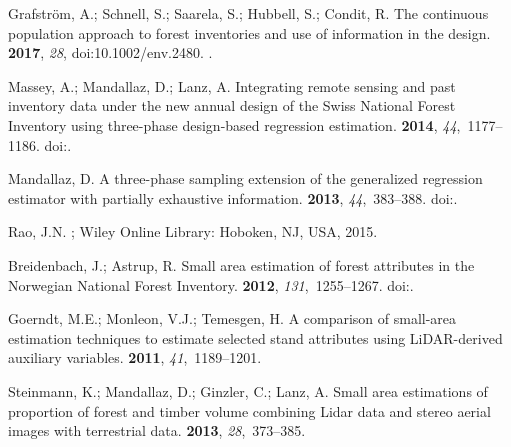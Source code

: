 \documentclass[remotesensing,article,accept,moreauthors,pdftex,10pt,a4paper]{Definitions/mdpi}
\begin{document}
\begin{thebibliography}{999}
Grafstr{\"o}m, A.; Schnell, S.; Saarela, S.; Hubbell, S.; Condit, R.
\newblock The continuous population approach to forest inventories and use of
  information in the design.
 {\bf 2017}, \emph{28}, doi:10.1002/env.2480.
.

Massey, A.; Mandallaz, D.; Lanz, A.
\newblock Integrating remote sensing and past inventory data under the new
  annual design of the Swiss National Forest Inventory using three-phase
  design-based regression estimation.
 {\bf 2014}, {\em
  44},~1177--1186.
\newblock
  doi:{\href{https://doi.org/10.1139/cjfr-2014-0152}{}}.

Mandallaz, D.
\newblock A three-phase sampling extension of the generalized regression
  estimator with partially exhaustive information.
 {\bf 2013}, {\em
  44},~383--388.
\newblock
  doi:{\href{https://doi.org/10.1139/cjfr-2013-0449}{}}.

Rao, J.N.
; Wiley Online Library: Hoboken, NJ, USA, 2015.

Breidenbach, J.; Astrup, R.
\newblock Small area estimation of forest attributes in the Norwegian National
  Forest Inventory.
 {\bf 2012}, {\em
  131},~1255--1267.
\newblock
  doi:{\href{https://doi.org/10.1007/s10342-012-0596-7}{}}.

Goerndt, M.E.; Monleon, V.J.; Temesgen, H.
\newblock A comparison of small-area estimation techniques to estimate selected
  stand attributes using LiDAR-derived auxiliary variables.
 {\bf 2011}, {\em
  41},~1189--1201.

Steinmann, K.; Mandallaz, D.; Ginzler, C.; Lanz, A.
\newblock Small area estimations of proportion of forest and timber volume
  combining Lidar data and stereo aerial images with terrestrial data.
 {\bf 2013}, {\em
  28},~373--385.


\end{thebibliography}
\end{document}
